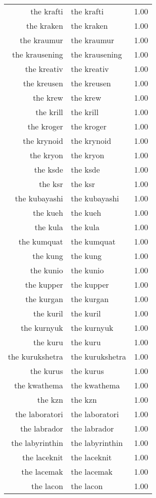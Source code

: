 \begin{table}[ht]
\begin{tabular}{rlr}
  the krafti & the krafti & 1.00 \\ 
  the kraken & the kraken & 1.00 \\ 
  the kraumur & the kraumur & 1.00 \\ 
  the krausening & the krausening & 1.00 \\ 
  the kreativ & the kreativ & 1.00 \\ 
  the kreusen & the kreusen & 1.00 \\ 
  the krew & the krew & 1.00 \\ 
  the krill & the krill & 1.00 \\ 
  the kroger & the kroger & 1.00 \\ 
  the krynoid & the krynoid & 1.00 \\ 
  the kryon & the kryon & 1.00 \\ 
  the ksde & the ksde & 1.00 \\ 
  the ksr & the ksr & 1.00 \\ 
  the kubayashi & the kubayashi & 1.00 \\ 
  the kueh & the kueh & 1.00 \\ 
  the kula & the kula & 1.00 \\ 
  the kumquat & the kumquat & 1.00 \\ 
  the kung & the kung & 1.00 \\ 
  the kunio & the kunio & 1.00 \\ 
  the kupper & the kupper & 1.00 \\ 
  the kurgan & the kurgan & 1.00 \\ 
  the kuril & the kuril & 1.00 \\ 
  the kurnyuk & the kurnyuk & 1.00 \\ 
  the kuru & the kuru & 1.00 \\ 
  the kurukshetra & the kurukshetra & 1.00 \\ 
  the kurus & the kurus & 1.00 \\ 
  the kwathema & the kwathema & 1.00 \\ 
  the kzn & the kzn & 1.00 \\ 
  the laboratori & the laboratori & 1.00 \\ 
  the labrador & the labrador & 1.00 \\ 
  the labyrinthin & the labyrinthin & 1.00 \\ 
  the laceknit & the laceknit & 1.00 \\ 
  the lacemak & the lacemak & 1.00 \\ 
  the lacon & the lacon & 1.00 \\ 

\end{tabular}
\end{table}
